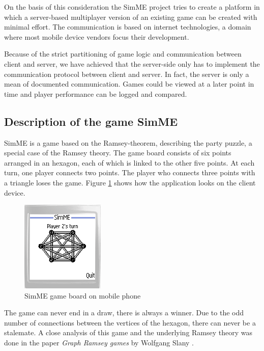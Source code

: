 	On the basis of this consideration the SimME project tries to create a
	platform in which a server-based multiplayer version of an existing game can
	be created with minimal effort. The communication is based on internet
	technologies, a domain where most mobile device vendors focus their
	development.

	Because of the strict partitioning of game logic and communication between
	client and server, we have achieved that the server-side only has to
	implement the communication protocol between client and server. In fact, the
	server is only a mean of documented communication. Games could be viewed at
	a later point in time and player performance can be logged and compared.

	\subsection{Description of the game SimME}

		SimME is a game based on the Ramsey-theorem, describing the party
		puzzle, a special case of the Ramsey theory. The game board consists of
		six points arranged in an hexagon, each of which is linked to the other
		five points. At each turn, one player connects two points. The player
		who connects three points with a triangle loses the game. Figure
		\ref{fig:gameboard} shows how the application looks on the client
		device.

		\begin{figure}[h]
		\begin{center}
			\includegraphics{pics/simme-screen.png}
			\caption{SimME game board on mobile phone}
			\label{fig:gameboard}
		\end{center}
		\end{figure}

		The game can never end in a draw, there is always a winner. Due to the
		odd number of connections between the vertices of the hexagon, there can
		never be a stalemate. A close analysis of this game and the underlying
		Ramsey theory was done in the paper \emph{Graph Ramsey games} by
		Wolfgang Slany \cite{slany_paper}.


